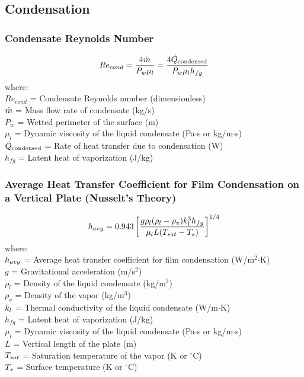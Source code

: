 \subsection{Condensation}
\subsubsection*{Condensate Reynolds Number}
\begin{equation}
    Re_{cond} = \frac{4 \dot{m}}{P_w \mu_l} = \frac{4 \dot{Q}_{\text{condensed}}}{P_w \mu_l h_{fg}}
\end{equation}
where: \\
$Re_{cond}$ = Condensate Reynolds number (dimensionless) \\
$\dot{m}$ = Mass flow rate of condensate (kg/s) \\
$P_w$ = Wetted perimeter of the surface (m) \\
$\mu_l$ = Dynamic viscosity of the liquid condensate (Pa$\cdot$s or kg/m$\cdot$s) \\
$\dot{Q}_{\text{condensed}}$ = Rate of heat transfer due to condensation (W) \\
$h_{fg}$ = Latent heat of vaporization (J/kg)

\subsubsection*{Average Heat Transfer Coefficient for Film Condensation on a Vertical Plate (Nusselt's Theory)}
\begin{equation}
    h_{avg} = 0.943 \left[ \frac{g \rho_l (\rho_l - \rho_v) k_l^3 h_{fg}}{\mu_l L (T_{sat} - T_s)} \right]^{1/4}
\end{equation}
where: \\
$h_{avg}$ = Average heat transfer coefficient for film condensation (W/m$^2$$\cdot$K) \\
$g$ = Gravitational acceleration (m/s$^2$) \\
$\rho_l$ = Density of the liquid condensate (kg/m$^3$) \\
$\rho_v$ = Density of the vapor (kg/m$^3$) \\
$k_l$ = Thermal conductivity of the liquid condensate (W/m$\cdot$K) \\
$h_{fg}$ = Latent heat of vaporization (J/kg) \\
$\mu_l$ = Dynamic viscosity of the liquid condensate (Pa$\cdot$s or kg/m$\cdot$s) \\
$L$ = Vertical length of the plate (m) \\
$T_{sat}$ = Saturation temperature of the vapor (K or $^\circ$C) \\
$T_s$ = Surface temperature (K or $^\circ$C)

